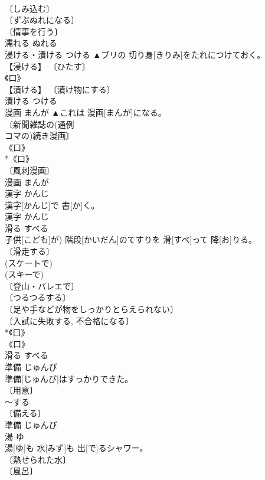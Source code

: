 \documentclass[8pt]{extreport}
\begin{document}
\begin{CJK}{UTF8}{min}
\\	〔しみ込む〕 
\\	〔ずぶぬれになる〕 
\\	〔情事を行う〕 
\\	濡れる	ぬれる	
\\	浸ける・漬ける	つける	▲ブリの 切り身[きりみ]をたれにつけておく。	
\\	【浸ける】 〔ひたす〕 
\\	《口》 
\\	【漬ける】 〔漬け物にする〕 
\\	漬ける	つける	
\\	漫画	まんが	▲これは 漫画[まんが]になる。	
\\	〔新聞雑誌の(通例 
\\	コマの)続き漫画〕 
\\	《口》 
\\	*《口》 
\\	〔風刺漫画〕 
\\	漫画	まんが	
\\	漢字	かんじ	
\\	漢字[かんじ]で 書[か]く。	
\\	漢字	かんじ	
\\	滑る	すべる	
\\	子供[こども]が) 階段[かいだん]のてすりを 滑[すべ]って 降[お]りる。	
\\	〔滑走する〕 
\\	(スケートで) 
\\	(スキーで) 
\\	〔登山・バレエで〕 
\\	〔つるつるする〕 
\\	〔足や手などが物をしっかりとらえられない〕 
\\	〔入試に失敗する, 不合格になる〕 
\\	*《口》 
\\	《口》 
\\	滑る	すべる	
\\	準備	じゅんび	
\\	準備[じゅんび]はすっかりできた。	
\\	〔用意〕 
\\	[＝ようい１, したく１] ～する 
\\	〔備える〕 
\\	準備	じゅんび	
\\	湯	ゆ	
\\	湯[ゆ]も 水[みず]も 出[で]るシャワー。	
\\	〔熱せられた水〕 
\\	〔風呂〕 

\end{CJK}
\end{document}
